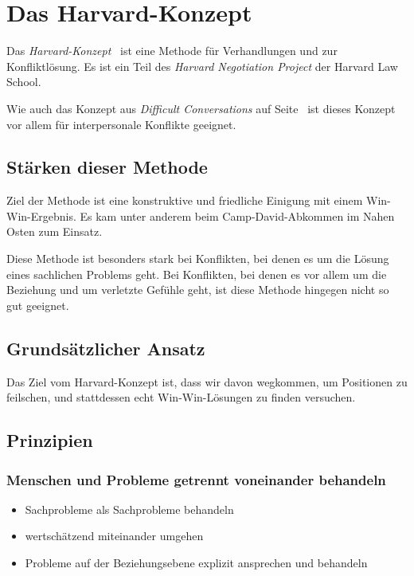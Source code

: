 \section{Das Harvard-Konzept}
\label{harvard-konzept}

Das \emph{Harvard-Konzept}~\cite{harvard-konzept} ist eine Methode für Verhandlungen und zur Konfliktlösung. Es ist ein Teil des \emph{Harvard Negotiation Project} der Harvard Law School.

Wie auch das Konzept aus \emph{Difficult Conversations} auf Seite~\pageref{difficult-conversations} ist dieses Konzept vor allem für interpersonale Konflikte geeignet.


\subsection{Stärken dieser Methode}

Ziel der Methode ist eine konstruktive und friedliche Einigung mit einem Win-Win-Ergebnis. Es kam unter anderem beim Camp-David-Abkommen im Nahen Osten zum Einsatz.

Diese Methode ist besonders stark bei Konflikten, bei denen es um die Lösung eines sachlichen Problems geht. Bei Konflikten, bei denen es vor allem um die Beziehung und um verletzte Gefühle geht, ist diese Methode hingegen nicht so gut geeignet.


\subsection{Grundsätzlicher Ansatz}

Das Ziel vom Harvard-Konzept ist, dass wir davon wegkommen, um Positionen zu feilschen, und stattdessen echt Win-Win-Lösungen zu finden versuchen.


\subsection{Prinzipien}


\subsubsection{Menschen und Probleme getrennt voneinander behandeln}

\begin{itemize}
  \item Sachprobleme als Sachprobleme behandeln
  \item wertschätzend miteinander umgehen
  \item Probleme auf der Beziehungsebene explizit ansprechen und behandeln
\end{itemize}


